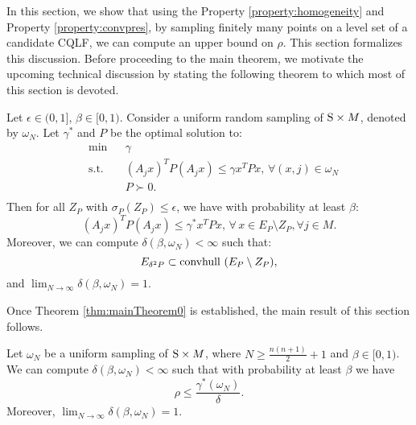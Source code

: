 In this section, we show that using the Property \ref{property:homogeneity} and Property \ref{property:convpres}, by sampling finitely many points on a level set of a candidate CQLF, we can compute an upper bound on $\rho$. This section formalizes this discussion. Before proceeding to the main theorem, we motivate the upcoming technical discussion by stating the following theorem to which most of this section is devoted.

\begin{theorem} \label{thm:mainTheorem0} Let $\epsilon \in (0,1]$, $\beta \in [0,1)$. Consider a uniform random sampling of $\text{S} \times M$, denoted by $\omega_N$. Let $\gamma^*$ and $P$ be the optimal solution to:
\begin{equation}\label{eqn:campiOpt01}
\begin{aligned}
& \text{min} & & \gamma \\
& \text{s.t.} 
&  & (A_j x)^TP(A_j x) \leq \gamma x^TPx,\,\forall (x, j) \in \omega_N \\
& && P \succ 0. \\
\end{aligned}
\end{equation}
Then for all $Z_P$ with $\sigma_P(Z_P)\leq \epsilon$, we have with probability at least $\beta$:
\begin{equation} \label{eqn:exceptEps}(A_j x)^TP(A_j x)\leq \gamma^*x^TPx,\,\forall\, x \in E_P \setminus Z_P, \forall j \in M.\end{equation}
Moreover, we can compute $\delta(\beta, \omega_N) < \infty$  such that:
\begin{equation}\label{eqn:contraction}E_{\delta^2P} \subset  \mbox{convhull } (E_{P} \setminus Z_{P}),
\end{equation}
and $\lim_{N \to \infty} \delta(\beta, \omega_N) = 1.$
\end{theorem}

Once Theorem \ref{thm:mainTheorem0} is established, the main result of this section follows.

\begin{theorem} \label{thm:mainTheorem} Let $\omega_N$ be a uniform sampling of $\text{S} \times M$, where $N \geq \frac{n(n+1)}{2}+1$ and $\beta \in [0,1)$. We can compute $\delta(\beta, \omega_N) < \infty$ such that with probability at least $\beta$ we have $$\rho \leq \frac{\gamma^*(\omega_N)}{\delta}.$$ Moreover, $\lim_{N \to \infty} \delta(\beta, \omega_N) = 1$.
\end{theorem}

